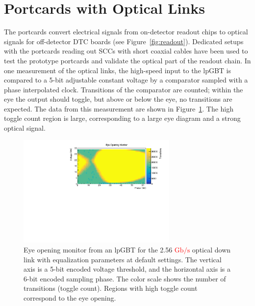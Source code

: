 \documentclass[a4paper,11pt]{article}
\newcommand{\vtrxp}{VTRx+}
\newcommand{\fig}{Figure}
\newcommand{\gbps}{\ensuremath{\mathrm{Gb}/\mathrm{s}}\xspace}
\newcommand{\red}{\textcolor{red}}
\begin{document}
\section{Portcards with Optical Links}
\label{sec:optical}

The portcards convert electrical signals from on-detector readout chips to optical signals for off-detector DTC boards (see \fig~\ref{fig:readout}).
Dedicated setups with the portcards reading out SCCs with short coaxial cables have been used to test the prototype portcards and validate the optical part of the readout chain.
In one measurement of the optical links, the high-speed input to the lpGBT is compared to a 5-bit adjustable constant voltage by a comparator sampled with a phase interpolated clock.
Transitions of the comparator are counted; within the eye the output should toggle, but above or below the eye, no transitions are expected.
The data from this measurement are shown in \fig~\ref{fig:lpgbt_eye}.
The high toggle count region is large, corresponding to a large eye diagram and a strong optical signal.

%


\begin{figure}[htbp]
\centering
\includegraphics[width=0.70\textwidth,origin=c]{../figures/lpGBT_eye.pdf}
\caption{
\label{fig:lpgbt_eye}
Eye opening monitor from an lpGBT for the 2.56 \red{\gbps} optical down link with equalization parameters at default settings.
The vertical axis is a 5-bit encoded voltage threshold, and the horizontal axis is a 6-bit encoded sampling phase.
The color scale shows the number of transitions (toggle count).
Regions with high toggle count correspond to the eye opening.
}
\end{figure}
\end{document}
